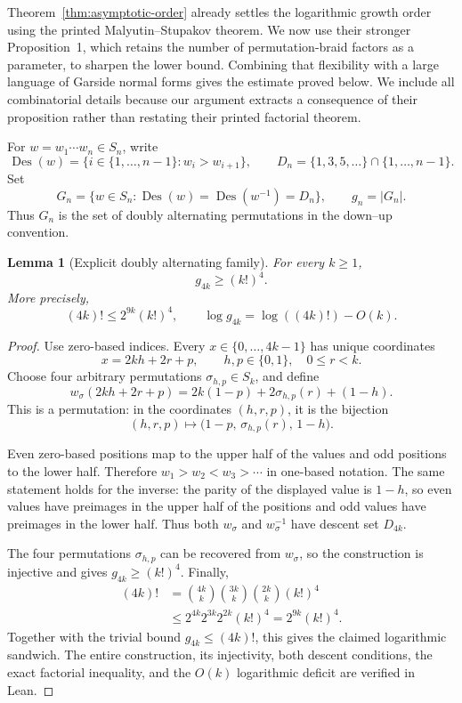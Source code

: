 \documentclass[11pt]{article}
\newtheorem{lemma}{Lemma}
\theoremstyle{remark}
\theoremstyle{plain}
\begin{document}
Theorem~\ref{thm:asymptotic-order} already settles the logarithmic growth
order using the printed Malyutin--Stupakov theorem.  We now use their stronger
Proposition~1, which retains the number of permutation-braid factors as a
parameter, to sharpen the lower bound.  Combining that flexibility with a
large language of Garside normal forms gives the estimate proved below.  We
include all combinatorial details because our argument extracts a consequence
of their proposition rather than restating their printed factorial theorem.

For \(w=w_1\cdots w_n\in S_n\), write
\[
    \operatorname{Des}(w)=\{i\in\{1,\ldots,n-1\}:w_i>w_{i+1}\},
    \qquad
    D_n=\{1,3,5,\ldots\}\cap\{1,\ldots,n-1\}.
\]
Set
\[
    G_n=\{w\in S_n:
       \operatorname{Des}(w)=\operatorname{Des}(w^{-1})=D_n\},
    \qquad g_n=|G_n|.
\]
Thus \(G_n\) is the set of doubly alternating permutations in the down--up
convention.

\begin{lemma}[Explicit doubly alternating family]\label{lem:doubly-alternating}
For every \(k\ge1\),
\[
    g_{4k}\ge (k!)^4.
\]
More precisely,
\[
    (4k)!\le 2^{9k}(k!)^4,
    \qquad
    \log g_{4k}=\log((4k)!)-O(k).
\]
\end{lemma}

\begin{proof}
Use zero-based indices.  Every \(x\in\{0,\ldots,4k-1\}\) has unique
coordinates
\[
    x=2kh+2r+p,
    \qquad h,p\in\{0,1\},\quad 0\le r<k.
\]
Choose four arbitrary permutations
\(\sigma_{h,p}\in S_k\), and define
\[
    w_\sigma(2kh+2r+p)
      =2k(1-p)+2\sigma_{h,p}(r)+(1-h).
\]
This is a permutation: in the coordinates \((h,r,p)\), it is the bijection
\[
    (h,r,p)\longmapsto
    \bigl(1-p,\,\sigma_{h,p}(r),\,1-h\bigr).
\]

Even zero-based positions map to the upper half of the values and odd
positions to the lower half.  Therefore
\(w_1>w_2<w_3>\cdots\) in one-based notation.  The same statement holds for
the inverse: the parity of the displayed value is \(1-h\), so even values
have preimages in the upper half of the positions and odd values have
preimages in the lower half.  Thus both \(w_\sigma\) and \(w_\sigma^{-1}\)
have descent set \(D_{4k}\).

The four permutations \(\sigma_{h,p}\) can be recovered from \(w_\sigma\),
so the construction is injective and gives \(g_{4k}\ge(k!)^4\).  Finally,
\[
\begin{aligned}
 (4k)!
 &=\binom{4k}{k}\binom{3k}{k}\binom{2k}{k}(k!)^4\\
 &\le 2^{4k}2^{3k}2^{2k}(k!)^4
 =2^{9k}(k!)^4.
\end{aligned}
\]
Together with the trivial bound \(g_{4k}\le(4k)!\), this gives the claimed
logarithmic sandwich.  The entire construction, its injectivity, both descent
conditions, the exact factorial inequality, and the \(O(k)\) logarithmic
deficit are verified in Lean.
\end{proof}
\end{document}

